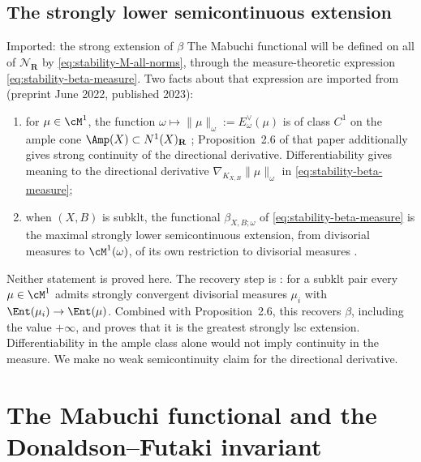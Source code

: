 \subsection{The strongly lower semicontinuous extension}
\label{sec:ch50-strong-lsc}

\begin{important}{Imported: the strong extension of $\beta$}
\label{imp:ch50-strong-lsc}
The Mabuchi functional will be defined on all of $\mathcal N_{\mathbf R}$
by \eqref{eq:stability-M-all-norms}, through the measure-theoretic
expression \eqref{eq:stability-beta-measure}.  Two facts about that
expression are imported from \cite{BJKS2} (preprint June 2022, published
2023):
\begin{enumerate}
\item\label{itm:ch50-slsc:diff}
      for $\mu\in\cM^1$, the function $\omega\mapsto\|\mu\|_\omega
      :=E^\vee_\omega(\mu)$ is of class $C^1$ on the ample cone
      $\Amp(X)\subset N^1(X)_{\mathbf R}$
      \cite[Theorem~2.15]{BJKS2}; Proposition~2.6 of that paper additionally gives strong continuity of the directional derivative.  Differentiability gives meaning to the
      directional derivative $\nabla_{K_{X,B}}\|\mu\|_\omega$ in
      \eqref{eq:stability-beta-measure};
\item\label{itm:ch50-slsc:extension}
      when $(X,B)$ is subklt, the functional
      $\beta_{X,B;\omega}$ of \eqref{eq:stability-beta-measure} is the
      maximal strongly lower semicontinuous extension, from divisorial
      measures to $\cM^1(\omega)$, of its own restriction to divisorial
      measures \cite[\S\S3.4 and 4.1]{BJKS2}.
\end{enumerate}
Neither statement is proved here.  The recovery step is
\cite[Theorem~3.10]{BJKS2}: for a subklt pair every $\mu\in\cM^1$
admits strongly convergent divisorial measures $\mu_i$ with
$\Ent(\mu_i)\to\Ent(\mu)$.  Combined with Proposition~2.6, this recovers
$\beta$, including the value $+\infty$, and proves that it is the
greatest strongly lsc extension.  Differentiability in the ample class
alone would not imply continuity in the measure.  We make no weak
semicontinuity claim for the directional derivative.
\end{important}

\section{The Mabuchi functional and the Donaldson--Futaki invariant}
\label{sec:ch50-mabuchi}

